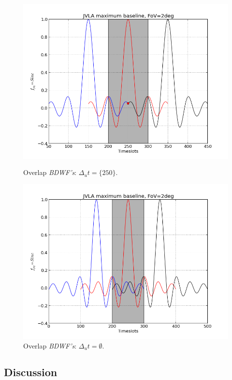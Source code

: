 \documentclass[useAMS,usenatbib]{mn2e}
\begin{document}
\begin{figure}
\begin{minipage}{0.38\linewidth}\includegraphics[width=1\textwidth]{./Figures/corrSigVLAMxBl.png}\caption{Overlap 
		\textit{BDWF's}: $\Delta_u t=\{250\}$.}\label{fig:fig_4}\end{minipage}
\begin{minipage}{0.38\linewidth}\includegraphics[width=1\textwidth]{./Figures/corrSigVLAMxBl_overlapGdelta.png}\caption{Overlap 
		\textit{BDWF's}: $\Delta_u t=\emptyset$.}\label{fig:fig_5}\end{minipage}
\end{figure}
\subsection{Discussion}
\end{document}
